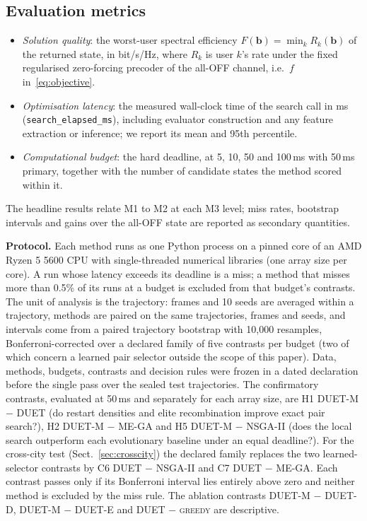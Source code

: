 \documentclass[runningheads]{llncs}
\newcommand{\duet}{\mbox{DUET}}\newcommand{\duetD}{\mbox{DUET-D}}\newcommand{\duetE}{\mbox{DUET-E}}
\newcommand{\bts}{\mbox{DUET-M}}
\begin{document}
\subsection{Evaluation metrics}\label{sec:metrics}
\begin{itemize}
\item[\textbf{M1}] \emph{Solution quality}: the worst-user spectral efficiency $F(\mathbf b)=\min_k R_k(\mathbf b)$ of the returned state, in bit/s/Hz, where $R_k$ is user $k$'s rate under the fixed regularised zero-forcing precoder of the all-OFF channel, i.e.\ $f$ in~\eqref{eq:objective}.
\item[\textbf{M2}] \emph{Optimisation latency}: the measured wall-clock time of the search call in ms (\texttt{search\_elapsed\_ms}), including evaluator construction and any feature extraction or inference; we report its mean and 95th percentile.
\item[\textbf{M3}] \emph{Computational budget}: the hard deadline, at 5, 10, 50 and 100\,ms with 50\,ms primary, together with the number of candidate states the method scored within it.
\end{itemize}
The headline results relate M1 to M2 at each M3 level; miss rates, bootstrap intervals and gains over the all-OFF state are reported as secondary quantities.

\textbf{Protocol.} Each method runs as one Python process on a pinned core of an AMD Ryzen 5 5600 CPU with single-threaded numerical libraries (one array size per core). A run whose latency exceeds its deadline is a miss; a method that misses more than 0.5\% of its runs at a budget is excluded from that budget's contrasts. The unit of analysis is the trajectory: frames and 10 seeds are averaged within a trajectory, methods are paired on the same trajectories, frames and seeds, and intervals come from a paired trajectory bootstrap with 10,000 resamples, Bonferroni-corrected over a declared family of five contrasts per budget (two of which concern a learned pair selector outside the scope of this paper). Data, methods, budgets, contrasts and decision rules were frozen in a dated declaration before the single pass over the sealed test trajectories. The confirmatory contrasts, evaluated at 50\,ms and separately for each array size, are H1 \bts{} $-$ \duet{} (do restart densities and elite recombination improve exact pair search?), H2 \bts{} $-$ ME-GA and H5 \bts{} $-$ NSGA-II (does the local search outperform each evolutionary baseline under an equal deadline?). For the cross-city test (Sect.~\ref{sec:crosscity}) the declared family replaces the two learned-selector contrasts by C6 \duet{} $-$ NSGA-II and C7 \duet{} $-$ ME-GA. Each contrast passes only if its Bonferroni interval lies entirely above zero and neither method is excluded by the miss rule. The ablation contrasts \bts{} $-$ \duetD{}, \bts{} $-$ \duetE{} and \duet{} $-$ \textsc{greedy} are descriptive.
\end{document}
